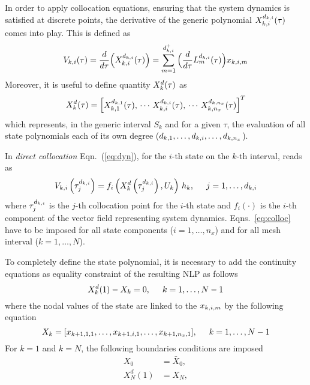 In order to apply collocation equations, ensuring that the system dynamics is satisfied at discrete points, the derivative of the generic polynomial $X_{k,i}^{d_{k,i}} (\tau)$ comes into play. This is defined as
\begin{equation}
V_{k,i} (\tau) = \frac{d}{d\tau}\Big(X_{k,i}^{d_{k,i}}(\tau)\Big) = \sum_{m=1}^{d_{k,i}^{+}}\Big(\frac{d}{d\tau}L_{m}^{d_{k,i}}(\tau)\Big)x_{k,i,m}
\end{equation}
Moreover, it is useful to define quantity $X_{k}^{d} (\tau)$ as
\begin{equation}
X_{k}^{d}(\tau) =
\begin{bmatrix}
X_{k,1}^{d_{k,1}}(\tau),\, \cdots \, X_{k,i}^{d_{k,i}}(\tau), \, \cdots\,
X_{k,n_x}^{d_{k,n_x}}(\tau)
\end{bmatrix}^T
\end{equation}
which represents, in the generic interval $S_k$ and for a given $\tau$, the evaluation of all state polynomials each of its own degree ($d_{k,1}, \dots, d_{k,i}, \dots, d_{k,n_{x}}$).

In \emph{direct collocation} Eqn.~(\ref{eq:dyn}), for the $i$-th state on the $k$-th interval, reads as
\begin{equation}\label{eq:colloc}
V_{k,i} \left(\tau_{j}^{d_{k,i}} \right) = f_i\left(X_{k}^{d} \left(\tau_{j}^{d_{k,i}}\right),  U_k\right)\, h_{k}, \hspace{5mm} j = 1, \dots, d_{k,i}
\end{equation}
where $\tau_{j}^{d_{k,i}}$ is the $j$-th collocation point for the $i$-th state and $f_i(\cdot)$ is the $i$-th component of the vector field representing system dynamics. Eqns.~\eqref{eq:colloc} have to be imposed for all state components ($i = 1, \dots, n_x$) and for all mesh interval ($k = 1, \dots, N$).

To completely define the state polynomial, it is necessary to add the continuity equations  as equality constraint of the resulting NLP as follows
\begin{equation}\label{eq:continuity}
X_{k}^{d}(1) - X_k = 0, \hspace{5mm} k = 1, \dots, N-1
\end{equation}
where the nodal values of the state are linked to the $x_{k,i,m}$ by the following equation
\begin{equation}
X_k = [x_{k+1,1,1}, \dots, x_{k+1,i,1}, \dots, x_{k+1,n_{x},1}], \hspace{5mm} k = 1, \dots, N-1
\end{equation}
For $k = 1$ and $k = N$, the following boundaries conditions are imposed
\begin{align}
	X_{0}         &= \bar{X}_{0} \label{eq:intial},\\
	X_{N}^{d}(1)  &= X_N \label{eq:final},
\end{align}

